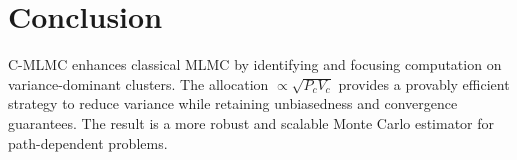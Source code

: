 \documentclass{article}
\begin{document}
\section{Conclusion}
C-MLMC enhances classical MLMC by identifying and focusing computation on variance-dominant clusters. The allocation \( \propto \sqrt{P_c V_c} \) provides a provably efficient strategy to reduce variance while retaining unbiasedness and convergence guarantees. The result is a more robust and scalable Monte Carlo estimator for path-dependent problems.
\end{document}
